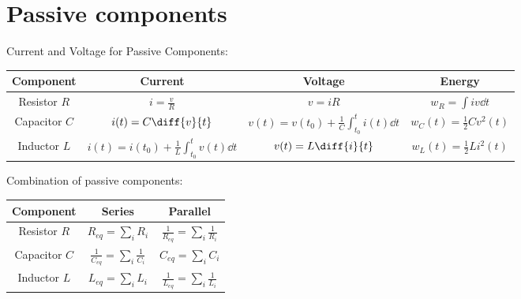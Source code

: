 \documentclass[a4paper,11pt]{article}
\begin{document}
	\section{Passive components}
	Current and Voltage for Passive Components:
	\begin{center}
	\begin{tabular}{| c | c | c | c |}
		\hline
		Component & Current & Voltage & Energy \\ \hline
		Resistor $R$ & $i = \frac{v}{R}$ & $v = iR$ & $w_R = \int iv \dd t$\\ \hline
		Capacitor $C$ & $i(t) = C\diff{v}{t}$ & $v(t) = v(t_0) + \frac{1}{C}\int_{t_0}^t i(t) \dd t$ & $w_C(t) = \frac{1}{2}Cv^2(t) $ \\ \hline
		Inductor $L$ & $i(t) = i(t_0) + \frac{1}{L} \int_{t_0}^t v(t) \dd t$ & $v(t) = L\diff{i}{t}$ & $w_L(t) = \frac{1}{2}Li^2(t)$\\ \hline
	\end{tabular}
	\end{center}
	Combination of passive components: 
	\begin{center}
	\begin{tabular}{| c | c | c |}
		\hline
		Component & Series & Parallel  \\ \hline
		Resistor $R$ & $R_{eq} = \sum_{i} R_i$ & $\frac{1}{R_{eq}} = \sum_{i} \frac{1}{R_i}$ \\ \hline
		Capacitor $C$ & $\frac{1}{C_{eq}} = \sum_{i} \frac{1}{C_i}$ & $C_{eq} = \sum_{i} C_i$  \\ \hline
		Inductor $L$ & $L_{eq} = \sum_{i} L_i$ & $\frac{1}{L_{eq}} = \sum_{i} \frac{1}{L_i}$\\ \hline
	\end{tabular}
	\end{center}
	
\end{document}
